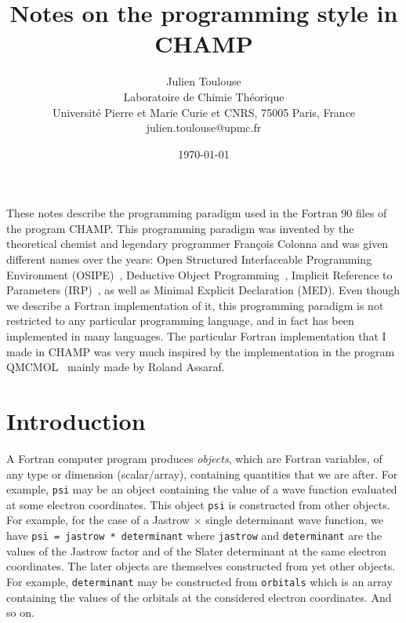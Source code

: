 \documentclass[a4paper,11pt]{article}
\begin{document}
\title{Notes on the programming style in CHAMP}

\author{Julien Toulouse\\
Laboratoire de Chimie Th\'eorique\\Universit\'e Pierre et Marie Curie et CNRS, 75005 Paris, France\\
julien.toulouse@upmc.fr}

\date{\today}

\maketitle

\setcounter{secnumdepth}{5}
\setcounter{tocdepth}{5}

\tableofcontents

\vspace*{5em}

These notes describe the programming paradigm used in the Fortran 90 files of the program CHAMP. This programming paradigm was invented by the theoretical chemist and legendary programmer François Colonna and was given different names over the years:
Open Structured Interfaceable Programming Environment (OSIPE)~\cite{ColJolPoiAngJan-CPC-94},
Deductive Object Programming~\cite{Col-ARX-06},
Implicit Reference to Parameters (IRP)~\cite{Sce-ARX-09},
as well as Minimal Explicit Declaration (MED).
Even though we describe a Fortran implementation of it, this programming paradigm is not restricted to any particular programming language, and in fact has been implemented in many languages. The particular Fortran implementation that I made in CHAMP was very much inspired by the implementation in the program QMCMOL~\cite{Qmc-PROG-XX} mainly made by Roland Assaraf.

\section{Introduction}
A Fortran computer program produces {\it objects}, which are Fortran variables, of any type or dimension (scalar/array), containing quantities that we are after. For example, {\tt psi} may be an object containing the value of a wave function evaluated at some electron coordinates. This object {\tt psi} is constructed from other objects. For example, for the case of a Jastrow $\times$ single determinant wave function, we have {\tt psi = jastrow * determinant} where {\tt jastrow} and {\tt determinant} are the values of the Jastrow factor and of the Slater determinant at the same electron coordinates. The later objects are themselves constructed from yet other objects. For example, {\tt determinant} may be constructed from {\tt orbitals} which is an array containing the values of the orbitals at the considered electron coordinates. And so on.
\end{document}
